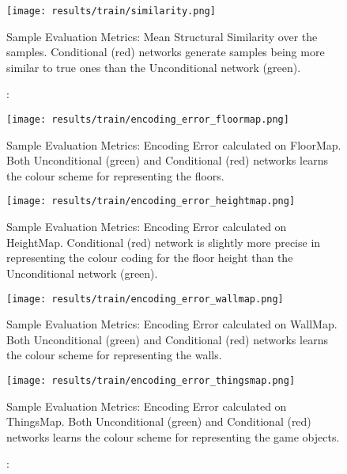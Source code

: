 \begin{figure}[!htb] 
	\begin{minipage}[b]{\linewidth}
		\centering
		\texttt{[image: results/train/similarity.png]} 
		\caption[Sample Evaluation Metrics: Mean Structural Similarity Index]: {Sample Evaluation Metrics: Mean Structural Similarity over the samples. Conditional (red) networks generate samples being more similar to true ones than the Unconditional network (green).}
		\label{fig:train-similarity}
	\end{minipage}
\end{figure}


\begin{figure}[!htb] 
	\begin{minipage}[b]{0.45\linewidth}
		\centering
		\texttt{[image: results/train/encoding\_error\_floormap.png]} 
		\caption[Sample Evaluation Metrics: Encoding Error (Floormap)]: {Sample Evaluation Metrics: Encoding Error calculated on FloorMap. Both Unconditional (green) and Conditional (red) networks learns the colour scheme for representing the floors.}
		\label{fig:train-encoding_error-floormap}
	\end{minipage}
	\hfil
	\begin{minipage}[b]{0.45\linewidth}
		\centering
		\texttt{[image: results/train/encoding\_error\_heightmap.png]} 
		\caption[Sample Evaluation Metrics: Encoding Error (HeightMap)]: {Sample Evaluation Metrics: Encoding Error calculated on HeightMap. Conditional (red) network is slightly more precise in representing the colour coding for the floor height than the Unconditional network (green).}
		\label{fig:train-encoding-error-heightmap}
	\end{minipage}
	
	\begin{minipage}[b]{0.45\linewidth}
		\centering
		\texttt{[image: results/train/encoding\_error\_wallmap.png]} 
		\caption[Sample Evaluation Metrics: Encoding Error (WallMap)]: {Sample Evaluation Metrics: Encoding Error calculated on WallMap. Both Unconditional (green) and Conditional (red) networks learns the colour scheme for representing the walls.}
		\label{fig:train-encoding-error-wallmap}
	\end{minipage}
	\hfil
	\begin{minipage}[b]{0.45\linewidth}
		\centering
		\texttt{[image: results/train/encoding\_error\_thingsmap.png]} 
		\caption[Sample Evaluation Metrics: Encoding Error (ThingsMap)]: {Sample Evaluation Metrics: Encoding Error calculated on ThingsMap. Both Unconditional (green) and Conditional (red) networks learns the colour scheme for representing the game objects.}
		\label{fig:train-encoding-error-thingsmap}
	\end{minipage}
\end{figure}

